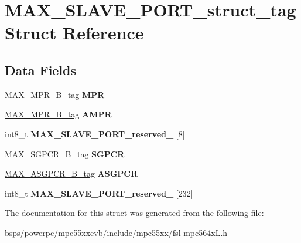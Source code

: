 \hypertarget{structMAX__SLAVE__PORT__struct__tag}{}\section{M\+A\+X\+\_\+\+S\+L\+A\+V\+E\+\_\+\+P\+O\+R\+T\+\_\+struct\+\_\+tag Struct Reference}
\label{structMAX__SLAVE__PORT__struct__tag}
\subsection*{Data Fields}
\begin{DoxyCompactItemize}
\item 
\mbox{\label{structMAX__SLAVE__PORT__struct__tag_a85676fe80ceb8a25d9eb80ab888faebc}} 
\mbox{\hyperlink{unionMAX__MPR__32B__tag}{M\+A\+X\+\_\+\+M\+P\+R\+\_\+B\+\_\+tag}} {\bfseries M\+PR}
\item 
\mbox{\label{structMAX__SLAVE__PORT__struct__tag_acd7b9ee343c33b69e625344cac820bd6}} 
\mbox{\hyperlink{unionMAX__MPR__32B__tag}{M\+A\+X\+\_\+\+M\+P\+R\+\_\+B\+\_\+tag}} {\bfseries A\+M\+PR}
\item 
\mbox{\label{structMAX__SLAVE__PORT__struct__tag_aa0ca5c775686e0488a292c3acc861c9a}} 
int8\+\_\+t {\bfseries M\+A\+X\+\_\+\+S\+L\+A\+V\+E\+\_\+\+P\+O\+R\+T\+\_\+reserved\+\_} \mbox{[}8\mbox{]}
\item 
\mbox{\label{structMAX__SLAVE__PORT__struct__tag_a3b8d323ebf8dc6ae9d9d64e7e1719c2d}} 
\mbox{\hyperlink{unionMAX__SGPCR__32B__tag}{M\+A\+X\+\_\+\+S\+G\+P\+C\+R\+\_\+B\+\_\+tag}} {\bfseries S\+G\+P\+CR}
\item 
\mbox{\label{structMAX__SLAVE__PORT__struct__tag_ac6b7d38f6f4a666247d714e54841eb6d}} 
\mbox{\hyperlink{unionMAX__ASGPCR__32B__tag}{M\+A\+X\+\_\+\+A\+S\+G\+P\+C\+R\+\_\+B\+\_\+tag}} {\bfseries A\+S\+G\+P\+CR}
\item 
\mbox{\label{structMAX__SLAVE__PORT__struct__tag_a6c1b0767a3de636e7afb23604f6edc0b}} 
int8\+\_\+t {\bfseries M\+A\+X\+\_\+\+S\+L\+A\+V\+E\+\_\+\+P\+O\+R\+T\+\_\+reserved\+\_} \mbox{[}232\mbox{]}
\end{DoxyCompactItemize}


The documentation for this struct was generated from the following file\+:\begin{DoxyCompactItemize}
\item 
bsps/powerpc/mpc55xxevb/include/mpc55xx/fsl-\/mpc564x\+L.\+h\end{DoxyCompactItemize}

